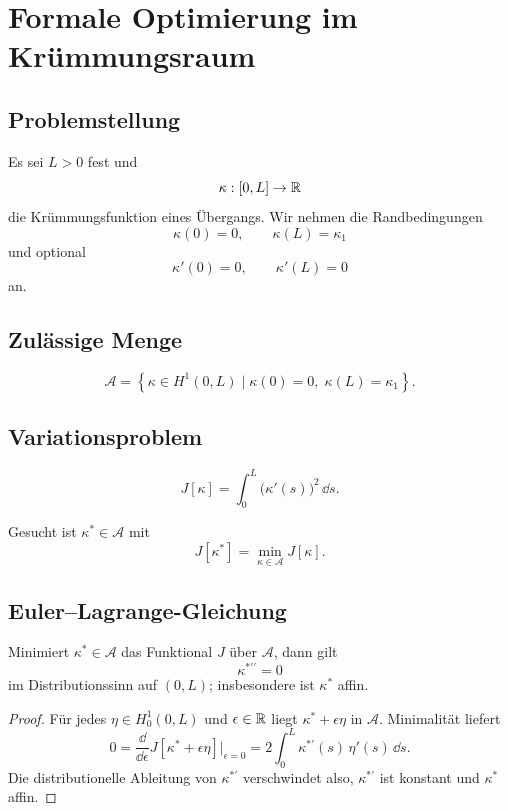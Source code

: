 \section{Formale Optimierung im Krümmungsraum}

\subsection{Problemstellung}
Es sei \(L>0\) fest und
\[
\kappa:[0,L]\to\mathbb{R}
\]
die Krümmungsfunktion eines Übergangs. Wir nehmen die Randbedingungen
\[
\kappa(0)=0,\qquad\kappa(L)=\kappa_1
\]
und optional
\[
\kappa'(0)=0,\qquad\kappa'(L)=0
\]
an.

\subsection{Zulässige Menge}
\begin{definition}
\[
\mathcal A=
\left\{\kappa\in H^1(0,L)\mid
\kappa(0)=0,\;\kappa(L)=\kappa_1\right\}.
\]
\end{definition}

\subsection{Variationsproblem}
\begin{definition}
\[
J[\kappa]=\int_0^L\bigl(\kappa'(s)\bigr)^2\,\dd s.
\]
\end{definition}
\begin{definition}[Optimierungsproblem]
Gesucht ist \(\kappa^\ast\in\mathcal A\) mit
\[
J[\kappa^\ast]=\min_{\kappa\in\mathcal A}J[\kappa].
\]
\end{definition}

\subsection{Euler--Lagrange-Gleichung}
\begin{proposition}
\label{prop:curvature-el}
Minimiert \(\kappa^\ast\in\mathcal A\) das Funktional \(J\) über
\(\mathcal A\), dann gilt
\[
\kappa^{\ast\prime\prime}=0
\]
im Distributionssinn auf \((0,L)\); insbesondere ist \(\kappa^\ast\) affin.
\end{proposition}

\begin{proof}
Für jedes \(\eta\in H_0^1(0,L)\) und \(\epsilon\in\mathbb{R}\) liegt
\(\kappa^\ast+\epsilon\eta\) in \(\mathcal A\). Minimalität liefert
\[
0=\frac{\dd}{\dd\epsilon}J[\kappa^\ast+\epsilon\eta]\Big|_{\epsilon=0}
=2\int_0^L\kappa^{\ast\prime}(s)\,\eta'(s)\,\dd s .
\]
Die distributionelle Ableitung von \(\kappa^{\ast\prime}\) verschwindet
also, \(\kappa^{\ast\prime}\) ist konstant und \(\kappa^\ast\) affin.
\end{proof}


